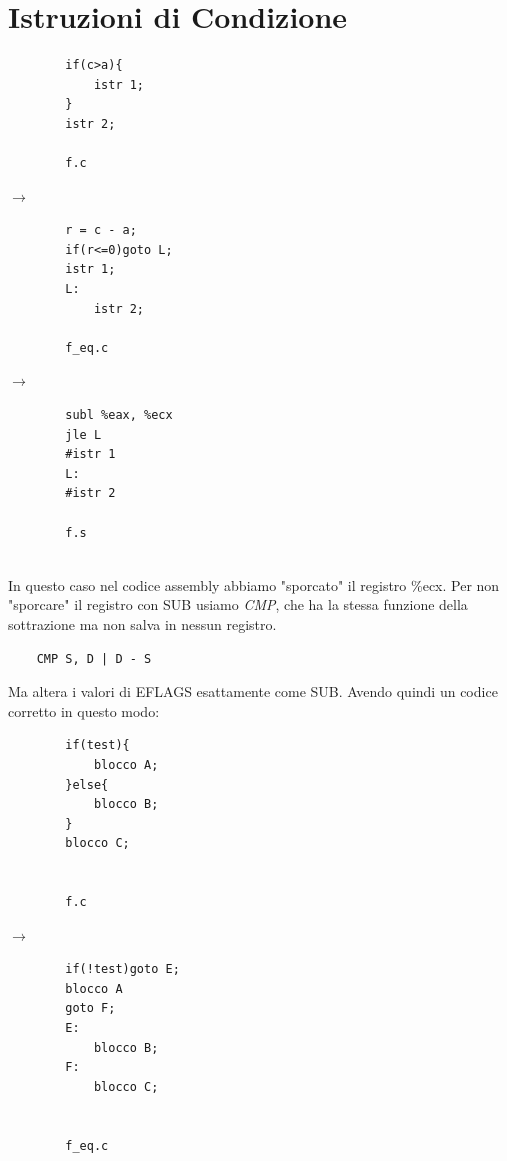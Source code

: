 \section{Istruzioni di Condizione}
\medskip
\begin{minipage}{0.2\textwidth}
    \begin{verbatim}
        if(c>a){
            istr 1;
        }
        istr 2;
        
        f.c
    \end{verbatim}
\end{minipage}
\hfill
$\longrightarrow$
\hfill
\begin{minipage}{0.2\textwidth}
    \begin{verbatim}
        r = c - a;
        if(r<=0)goto L;
        istr 1;
        L:
            istr 2;
    
        f_eq.c
    \end{verbatim}
\end{minipage}
\hfill
$\longrightarrow$
\hfill
\begin{minipage}{0.2\textwidth}
    \begin{verbatim}
        subl %eax, %ecx
        jle L
        #istr 1
        L:
        #istr 2
        
        f.s
    \end{verbatim}
\end{minipage}\bigskip \\
\noindent In questo caso nel codice assembly abbiamo "sporcato" il registro \%ecx. Per non "sporcare" il registro con SUB usiamo \textit{CMP}, che ha la stessa funzione della sottrazione ma non salva in nessun registro.
\begin{verbatim}
    CMP S, D | D - S
\end{verbatim}
Ma altera i valori di EFLAGS esattamente come SUB. Avendo quindi un codice corretto in questo modo:\medskip\\
\begin{minipage}{0.3\textwidth}
    \begin{verbatim}
        if(test){
            blocco A;
        }else{
            blocco B;
        }
        blocco C;

        
        f.c
    \end{verbatim}
\end{minipage}
\hfill
$\longrightarrow$
\hfill
\begin{minipage}{0.3\textwidth}
    \begin{verbatim}
        if(!test)goto E;
        blocco A
        goto F;
        E:
            blocco B;
        F:
            blocco C;

    
        f_eq.c
    \end{verbatim}
\end{minipage}
